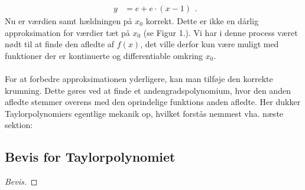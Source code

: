 \documentclass[12pt, a4paper]{article}
\begin{document}
\begin{refsection}
\[\begin{aligned}
    y&=e+e\cdot (x-1)
\end{aligned}
.\] 
Nu er værdien samt hældningen på $x_0$ korrekt. Dette er ikke en dårlig approksimation for værdier tæt på $x_0$ (se Figur 1.). Vi har i denne process været nødt til at finde den afledte af $f(x)$, det ville derfor kun være muligt med funktioner der er kontinuerte og differentiable omkring $x_0$. \\
\\
For at forbedre approksimationen yderligere, kan man tilføje den korrekte krumning. Dette gøres ved at finde et andengradspolynomium, hvor den anden afledte stemmer overens med den oprindelige funktions anden afledte. Her dukker Taylorpolynomiers egentlige mekanik op, hvilket forstås nemmest vha. næste sektion:

\subsection{Bevis for Taylorpolynomiet}
\begin{proof}[Bevis]
    

\end{proof}
\end{refsection}
\end{document}
